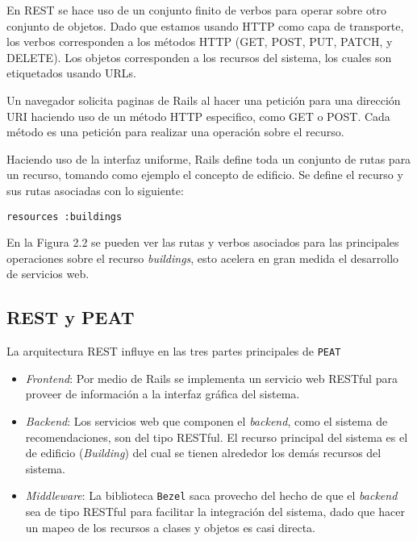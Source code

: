 En REST se hace uso de un conjunto finito de verbos para operar sobre otro
conjunto de objetos. Dado que estamos usando HTTP como capa de transporte, los
verbos corresponden a los métodos HTTP (GET, POST, PUT, PATCH, y DELETE).
Los objetos corresponden a los recursos del sistema, los cuales son etiquetados
usando URLs.

Un navegador solicita paginas de Rails al hacer una petición para una dirección URI
haciendo uso de un método HTTP especifico, como GET o POST. Cada método es una
petición para realizar una operación sobre el recurso.

Haciendo uso de la interfaz uniforme, Rails define toda un conjunto de rutas
para un recurso, tomando como ejemplo el concepto de edificio. Se define
el recurso y sus rutas asociadas con lo siguiente:

\begin{verbatim}
resources :buildings
\end{verbatim}

En la Figura 2.2 se pueden ver las rutas y verbos asociados para las principales
operaciones sobre el recurso \textit{buildings}, esto acelera en gran medida
el desarrollo de servicios web.


\subsection{REST y PEAT}
La arquitectura REST influye en las tres partes principales de \texttt{PEAT}

\begin{itemize}
\item \textit{Frontend}: Por medio de Rails se implementa un servicio web RESTful
  para proveer de información a la interfaz gráfica del sistema.
\item \textit{Backend}: Los servicios web que componen el \textit{backend}, como el
  sistema de recomendaciones, son del tipo RESTful. El recurso principal del sistema
  es el de edificio (\textit{Building}) del cual se tienen alrededor los demás
  recursos del sistema.
\item \textit{Middleware}: La biblioteca \texttt{Bezel} saca provecho del hecho
  de que el \textit{backend} sea de tipo RESTful para facilitar la integración del
  sistema, dado que hacer un mapeo de los recursos a clases y objetos es
  casi directa.

\end{itemize}


